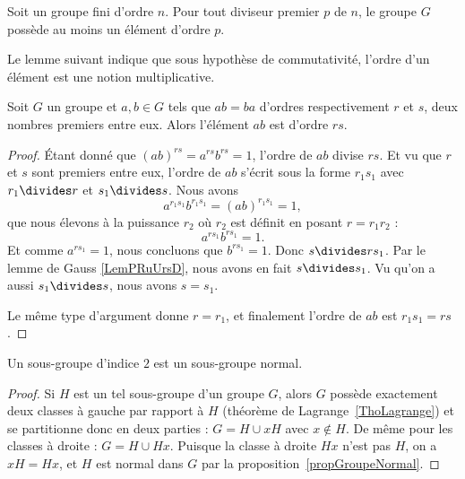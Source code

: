 \begin{theorem}    \label{THOooSUWKooICbzqM}
    Soit un groupe fini d'ordre \( n\). Pour tout diviseur premier \( p\) de \( n\), le groupe \( G\) possède au moins un élément d'ordre \( p\).
\end{theorem}

Le lemme suivant indique que sous hypothèse de commutativité, l'ordre d'un élément est une notion multiplicative.
\begin{lemma}    \label{LemyETtdy}
    Soit \( G\) un groupe et \( a,b\in G\) tels que \( ab=ba\) d'ordres respectivement \( r\) et \( s\), deux nombres premiers entre eux. Alors l'élément \( ab\) est d'ordre \( rs\).
\end{lemma}

\begin{proof}
    Étant donné que \( (ab)^{rs}=a^{rs}b^{rs}=1\), l'ordre de \( ab\) divise \( rs\). Et vu que \( r\) et \( s\) sont premiers entre eux, l'ordre de \( ab\) s'écrit sous la forme \( r_1s_1\) avec \( r_1\divides r\) et \( s_1\divides s\). Nous avons
    \begin{equation}
        a^{r_1s_1}b^{r_1s_1}=(ab)^{r_1s_1}=1,
    \end{equation}
    que nous élevons à la puissance \( r_2\) où \( r_2\) est définit en posant \(r=r_1r_2\) :
    \begin{equation}
        a^{rs_1}b^{rs_1}=1.
    \end{equation}
    Et comme \( a^{rs_1}=1\), nous concluons que \( b^{rs_1}=1\). Donc \( s\divides rs_1\). Par le lemme de Gauss \ref{LemPRuUrsD}, nous avons en fait \( s\divides s_1\). Vu qu'on a aussi \( s_1\divides s\), nous avons \( s=s_1\).

    Le même type d'argument donne \( r=r_1\), et finalement l'ordre de \( ab\) est \( r_1s_1=rs\).
\end{proof}

\begin{lemma}    \label{LemSkIOOG}
    Un sous-groupe d'indice \( 2\) est un sous-groupe normal.
\end{lemma}

\begin{proof}
    Si $H$ est un tel sous-groupe d'un groupe $G$, alors $G$ possède exactement deux classes à gauche par rapport à \( H\) (théorème de Lagrange~\ref{ThoLagrange}) et se partitionne donc en deux parties : \( G=H\cup xH\) avec \( x \notin H \). De même pour les classes à droite : \( G=H\cup Hx\). Puisque la classe à droite \( Hx \) n'est pas $H$, on a \( xH = Hx \), et $H$ est normal dans $G$ par la proposition~\ref{propGroupeNormal}.
\end{proof}

